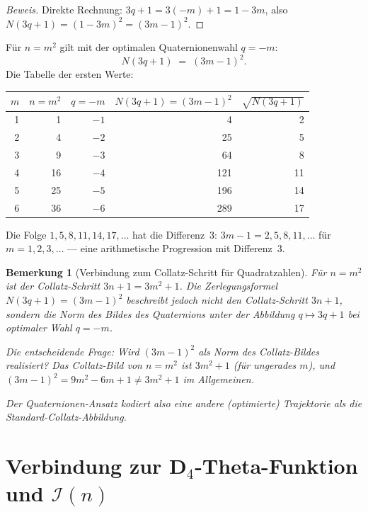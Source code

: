 \documentclass[12pt,a4paper]{article}
\newtheorem{bemerkung}[definition]{Bemerkung}
\newenvironment{beweis}{\begin{proof}[Beweis]}{\end{proof}}
\begin{document}
\begin{beweis}
Direkte Rechnung: $3q+1 = 3(-m)+1 = 1-3m$, also
$N(3q+1) = (1-3m)^2 = (3m-1)^2$. \qedhere
\end{beweis}

\begin{tcolorbox}[ergebnis, title={Schöner Spezialfall: Quadratzahlen}]
Für $n = m^2$ gilt mit der optimalen Quaternionenwahl $q = -m$:
\[
  N(3q+1) \;=\; (3m-1)^2.
\]
Die Tabelle der ersten Werte:
\begin{center}
\renewcommand{\arraystretch}{1.3}
\begin{tabular}{rrrrr}
\toprule
$m$ & $n = m^2$ & $q = -m$ & $N(3q+1) = (3m-1)^2$ & $\sqrt{N(3q+1)}$ \\
\midrule
1 &  1 & $-1$ &   4 &  2 \\
2 &  4 & $-2$ &  25 &  5 \\
3 &  9 & $-3$ &  64 &  8 \\
4 & 16 & $-4$ & 121 & 11 \\
5 & 25 & $-5$ & 196 & 14 \\
6 & 36 & $-6$ & 289 & 17 \\
\bottomrule
\end{tabular}
\end{center}
Die Folge $1, 5, 8, 11, 14, 17, \ldots$ hat die Differenz~3: $3m-1 = 2, 5, 8, 11, \ldots$
für $m = 1, 2, 3, \ldots$ --- eine arithmetische Progression mit Differenz~3.
\end{tcolorbox}

\begin{bemerkung}[Verbindung zum Collatz-Schritt für Quadratzahlen]
Für $n = m^2$ ist der Collatz-Schritt $3n+1 = 3m^2+1$. Die Zerlegungsformel
$N(3q+1) = (3m-1)^2$ beschreibt jedoch nicht den Collatz-Schritt $3n+1$,
sondern die Norm des Bildes des Quaternions unter der Abbildung $q \mapsto 3q+1$
bei optimaler Wahl $q = -m$.

Die entscheidende Frage: Wird $(3m-1)^2$ als Norm des Collatz-Bildes realisiert?
Das Collatz-Bild von $n = m^2$ ist $3m^2+1$ (für ungerades $m$), und
$(3m-1)^2 = 9m^2 - 6m + 1 \neq 3m^2 + 1$ im Allgemeinen.

Der Quaternionen-Ansatz kodiert also eine andere (optimierte) Trajektorie als
die Standard-Collatz-Abbildung.
\end{bemerkung}

\section{Verbindung zur D\texorpdfstring{${}_4$}{4}-Theta-Funktion und \texorpdfstring{$\mathcal{I}(n)$}{I(n)}}
\label{sec:theta}
\end{document}
